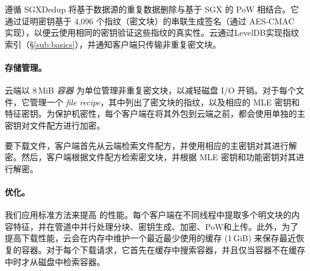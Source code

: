 \prototype 遵循 SGXDedup 将基于数据源的重复数据删除与基于 SGX 的 PoW 相结合。它通过证明密钥基于 4,096 个指纹（密文块）的串联生成签名（通过 AES-CMAC 实现），以便云使用相同的密钥验证这些指纹的真实性。云通过LevelDB\cite{leveldb}实现指纹索引（\S\ref{sub:basics}），并通知客户端只传输非重复密文块。

\paragraph{存储管理。}
云端以 8\,MiB {\em 容器} 为单位管理非重复密文块，以减轻磁盘 I/O 开销。对于每个文件，它管理一个 {\em file recipe}，其中列出了密文块的指纹，以及相应的 MLE 密钥和特征密钥。为保护机密性，每个客户端在将其外包到云端之前，都会使用单独的主密钥对文件配方进行加密。

要下载文件，客户端首先从云端检索文件配方，并使用相应的主密钥对其进行解密。然后，客户端根据文件配方检索密文块，并根据 MLE 密钥和功能密钥对其进行解密。

\paragraph{优化。}
我们应用标准方法来提高 \prototype 的性能。每个客户端在不同线程中提取多个明文块的内容特征，并在管道中并行处理分块、密钥生成、加密、PoW和上传。此外，为了提高下载性能，云会在内存中维护一个最近最少使用的缓存 (1\,GiB) 来保存最近恢复的容器。对于每个下载请求，它首先在缓存中搜索容器，并且仅当容器不在缓存中时才从磁盘中检索容器。